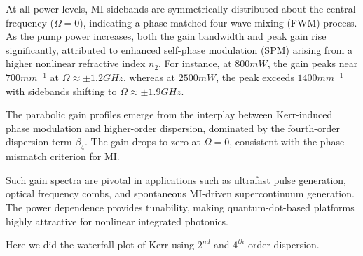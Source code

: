 \documentclass[12pt,a4paper]{article}
\begin{document}
At all power levels, MI sidebands are symmetrically distributed about the central frequency (\( \Omega = 0 \)), indicating a phase-matched four-wave mixing (FWM) process. As the pump power increases, both the gain bandwidth and peak gain rise significantly, attributed to enhanced self-phase modulation (SPM) arising from a higher nonlinear refractive index \( n_2 \). For instance, at ${800}{mW}$, the gain peaks near ${700}{mm^{-1}}$ at \( \Omega \approx \pm {1.2}{GHz} \), whereas at ${2500}{mW}$, the peak exceeds ${1400}{mm^{-1}}$ with sidebands shifting to \( \Omega \approx \pm {1.9}{GHz} \).

The parabolic gain profiles emerge from the interplay between Kerr-induced phase modulation and higher-order dispersion, dominated by the fourth-order dispersion term \( \beta_4 \). The gain drops to zero at \( \Omega = 0 \), consistent with the phase mismatch criterion for MI.

Such gain spectra are pivotal in applications such as ultrafast pulse generation, optical frequency combs, and spontaneous MI-driven supercontinuum generation. The power dependence provides tunability, making quantum-dot-based platforms highly attractive for nonlinear integrated photonics.

Here we did the waterfall plot of Kerr using $2^{nd}$ and \(4^{th}\) order dispersion. 
\end{document}
